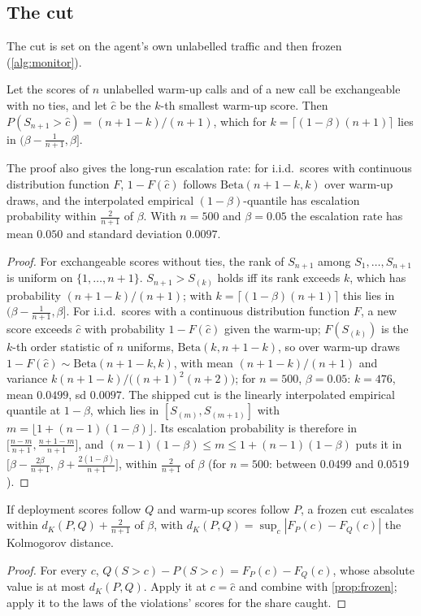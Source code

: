 \subsection{The cut}
\label{app:cut}
The cut is set on the agent's own unlabelled traffic and then frozen (\cref{alg:monitor}).
\begin{proposition}\label{prop:frozen}
Let the scores of $n$ unlabelled warm-up calls and of a new call be exchangeable with no ties, and let $\hat c$ be the $k$-th smallest warm-up score. Then $P(S_{n+1}>\hat c)=(n+1-k)/(n+1)$, which for $k=\lceil(1-\beta)(n+1)\rceil$ lies in $\big(\beta-\tfrac1{n+1},\beta\big]$.
\end{proposition}
The proof also gives the long-run escalation rate: for i.i.d.\ scores with continuous distribution function $F$, $1-F(\hat c)$ follows $\mathrm{Beta}(n+1-k,k)$ over warm-up draws, and the interpolated empirical $(1-\beta)$-quantile has escalation probability within $\tfrac{2}{n+1}$ of $\beta$. With $n=500$ and $\beta=0.05$ the escalation rate has mean $0.050$ and standard deviation $0.0097$.
\begin{proof}
For exchangeable scores without ties, the rank of $S_{n+1}$ among
$S_1,\dots,S_{n+1}$ is uniform on $\{1,\dots,n+1\}$. $S_{n+1}>S_{(k)}$ holds iff its rank exceeds $k$, which has probability
$(n+1-k)/(n+1)$; with $k=\lceil(1-\beta)(n+1)\rceil$ this lies in $(\beta-\frac{1}{n+1},\beta]$. For i.i.d.\ scores with a continuous
distribution function $F$, a new score exceeds $\hat c$ with probability $1-F(\hat c)$ given the warm-up; $F(S_{(k)})$ is the $k$-th
order statistic of $n$ uniforms, $\mathrm{Beta}(k,n+1-k)$, so over warm-up draws $1-F(\hat c)\sim\mathrm{Beta}(n+1-k,k)$, with mean
$(n+1-k)/(n+1)$ and variance $k(n+1-k)/\big((n+1)^2(n+2)\big)$; for $n=500$, $\beta=0.05$: $k=476$, mean $0.0499$, sd $0.0097$.
The shipped cut is the linearly interpolated empirical quantile at $1-\beta$, which lies in $[S_{(m)},S_{(m+1)}]$ with
$m=\lfloor 1+(n-1)(1-\beta)\rfloor$. Its escalation probability is therefore in $\big[\tfrac{n-m}{n+1},\tfrac{n+1-m}{n+1}\big]$, and
$(n-1)(1-\beta)\le m\le 1+(n-1)(1-\beta)$ puts it in $\big[\beta-\tfrac{2\beta}{n+1},\,\beta+\tfrac{2(1-\beta)}{n+1}\big]$, within
$\tfrac2{n+1}$ of $\beta$ (for $n=500$: between $0.0499$ and $0.0519$).
\end{proof}

\begin{proposition}[shift]\label{prop:shift}
If deployment scores follow $Q$ and warm-up scores follow $P$, a frozen cut escalates within $d_K(P,Q)+\tfrac2{n+1}$ of $\beta$, with $d_K(P,Q)=\sup_c|F_P(c)-F_Q(c)|$ the Kolmogorov distance.
\end{proposition}
\begin{proof}
For every $c$, $Q(S>c)-P(S>c)=F_P(c)-F_Q(c)$, whose absolute value is at most
$d_K(P,Q)$. Apply it at $c=\hat c$ and combine with \cref{prop:frozen}; apply it to the laws of the violations' scores for the
share caught.
\end{proof}

